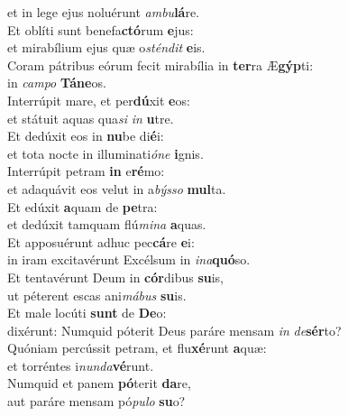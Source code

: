 \oddverse et in lege ejus noluérunt \textit{am}\textit{bu}\textbf{lá}re.\\
\evenverse Et oblíti sunt benefa\textbf{ctó}rum \textbf{e}jus:~\*\\
\evenverse et mirabílium ejus quæ o\textit{stén}\textit{dit} \textbf{e}is.\\
\oddverse Coram pátribus eórum fecit mirabília in \textbf{ter}ra Æ\textbf{gýp}ti:~\*\\
\oddverse in \textit{cam}\textit{po} \textbf{Tá}\textbf{ne}os.\\
\evenverse Interrúpit mare, et per\textbf{dú}xit \textbf{e}os:~\*\\
\evenverse et státuit aquas qua\textit{si} \textit{in} \textbf{u}tre.\\
\oddverse Et dedúxit eos in \textbf{nu}be di\textbf{é}i:~\*\\
\oddverse et tota nocte in illuminati\textit{ó}\textit{ne} \textbf{i}gnis.\\
\evenverse Interrúpit petram \textbf{in} e\textbf{ré}mo:~\*\\
\evenverse et adaquávit eos velut in a\textit{býs}\textit{so} \textbf{mul}ta.\\
\oddverse Et edúxit \textbf{a}quam de \textbf{pe}tra:~\*\\
\oddverse et dedúxit tamquam flú\textit{mi}\textit{na} \textbf{a}quas.\\
\evenverse Et apposuérunt adhuc pec\textbf{cá}re \textbf{e}i:~\*\\
\evenverse in iram excitavérunt Excélsum in \textit{i}\textit{na}\textbf{quó}so.\\
\oddverse Et tentavérunt Deum in \textbf{cór}dibus \textbf{su}is,~\*\\
\oddverse ut péterent escas ani\textit{má}\textit{bus} \textbf{su}is.\\
\evenverse Et male locúti \textbf{sunt} de \textbf{De}o:~\*\\
\evenverse dixérunt: Numquid póterit Deus paráre mensam \textit{in} \textit{de}\textbf{sér}to?\\
\oddverse Quóniam percússit petram, et flu\textbf{xé}runt \textbf{a}quæ:~\*\\
\oddverse et torréntes i\textit{nun}\textit{da}\textbf{vé}runt.\\
\evenverse Numquid et panem \textbf{pó}terit \textbf{da}re,~\*\\
\evenverse aut paráre mensam pó\textit{pu}\textit{lo} \textbf{su}o?\\
